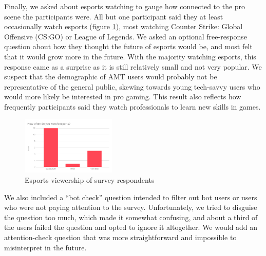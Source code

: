\documentclass[11pt,manuscript,screen,review]{acmart} %
\begin{document}

Finally, we asked about esports watching to gauge how connected to the pro scene the participants were. All but one participant said they at least occasionally watch esports (figure \ref{fig:amt-esports}), most watching Counter Strike: Global Offensive (CS:GO) or League of Legends. We asked an optional free-response question about how they thought the future of esports would be, and most felt that it would grow more in the future. With the majority watching esports, this response came as a surprise as it is still relatively small and not very popular. We suspect that the demographic of AMT users would probably not be representative of the general public, skewing towards young tech-savvy users who would more likely be interested in pro gaming. This result also reflects how frequently participants said they watch professionals to learn new skills in games.

\begin{figure}[h]
    \centering
    \includegraphics[width=0.4\textwidth]{img/amt-esports.png}
    \caption{Esports viewership of survey respondents}
    \label{fig:amt-esports}
\end{figure}

We also included a “bot check” question intended to filter out bot users or users who were not paying attention to the survey. Unfortunately, we tried to disguise the question too much, which made it somewhat confusing, and about a third of the users failed the question and opted to ignore it altogether. We would add an attention-check question that was more straightforward and impossible to misinterpret in the future. 
\end{document}
